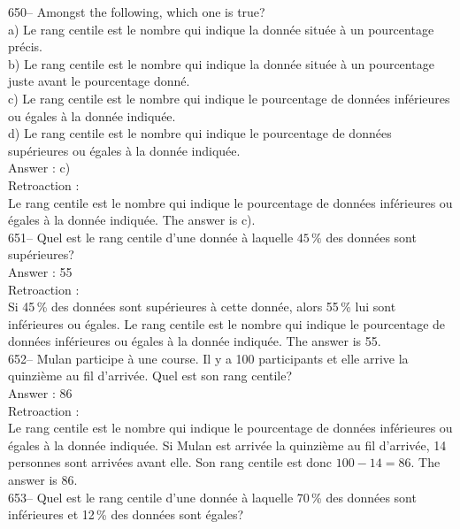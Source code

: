 ﻿\documentclass[letterpaper, 12pt]{article}
\begin{document}
650-- Amongst the following, which one is true?\\
a) Le rang centile est le nombre qui indique la donn\'ee situ\'ee \`a un
pourcentage pr\'ecis.  \\
b) Le rang centile est le nombre qui indique la donn\'ee situ\'ee \`a un
pourcentage juste avant le pourcentage donn\'e.\\
c) Le rang centile est le nombre qui indique le pourcentage de donn\'ees
inf\'erieures ou \'egales \`a la donn\'ee indiqu\'ee. \\
d) Le rang centile est le nombre qui indique le pourcentage de donn\'ees
sup\'erieures ou \'egales \`a la donn\'ee indiqu\'ee.\\

Answer : c)\\

Retroaction : \\
Le rang centile est le nombre qui indique le pourcentage de donn\'ees
inf\'erieures ou \'egales \`a la donn\'ee indiqu\'ee. The answer is c).\\

651-- Quel est le rang centile d'une donn\'ee \`a laquelle $45\,\%$ des
donn\'ees sont sup\'erieures?\\

Answer : 55\\

Retroaction : \\
Si 45\,\% des donn\'ees sont sup\'erieures \`a cette donn\'ee, alors 55\,\%
lui sont inf\'erieures ou \'egales.  Le rang centile est le nombre qui
indique le pourcentage de donn\'ees inf\'erieures ou \'egales \`a la
donn\'ee indiqu\'ee.  The answer is 55.\\

652-- Mulan participe \`a une course.  Il y a 100 participants et elle
arrive la quinzi\`eme au fil d'arriv\'ee.  Quel est son rang centile?\\

Answer : 86\\

Retroaction : \\
Le rang centile est le nombre qui indique le pourcentage de donn\'ees
inf\'erieures ou \'egales \`a la donn\'ee indiqu\'ee.  Si Mulan est
arriv\'ee la quinzi\`eme au fil d'arriv\'ee, 14 personnes sont arriv\'ees
avant elle.  Son rang centile est donc $100-14=86$.  The answer is 86.\\

653-- Quel est le rang centile d'une donn\'ee \`a laquelle 70\,\% des
donn\'ees sont inf\'erieures et 12\,\% des donn\'ees sont \'egales?\\
\end{document}
